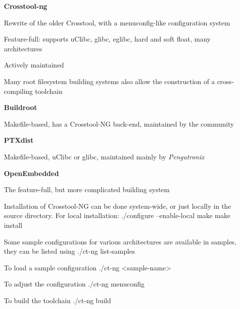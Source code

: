   \startitemize
  \item {\bf Crosstool-ng}
    \startitemize
    \item Rewrite of the older Crosstool, with a menuconfig-like configuration
      system
    \item Feature-full: supports uClibc, glibc, eglibc, hard and soft
      float, many architectures
    \item Actively maintained
    \item {}
    \stopitemize
  \stopitemize

Many root filesystem building systems also allow the construction of
a cross-compiling toolchain
\startitemize
\item {\bf Buildroot}
  \startitemize
  \item Makefile-based, has a Crosstool-NG back-end, maintained by the
    community
  \item {}
  \stopitemize
\item {\bf PTXdist}
  \startitemize
  \item Makefile-based, uClibc or glibc, maintained mainly by {\em Pengutronix}
  \item {}
  \stopitemize
\item {\bf OpenEmbedded}
  \startitemize
  \item The feature-full, but more complicated building system
  \item {}
  \stopitemize
\stopitemize

  \startitemize
  \item Installation of Crosstool-NG can be done system-wide, or just locally in
    the source directory. For local installation:
\starttyping
./configure --enable-local
make
make install
\stoptyping
  \item Some sample configurations for various architectures are
    available in
    samples, they can be listed using
\starttyping
./ct-ng list-samples
\stoptyping
  \item To load a sample configuration
\starttyping
./ct-ng <sample-name>
\stoptyping
  \item To adjust the configuration
\starttyping
./ct-ng menuconfig
\stoptyping
  \item To build the toolchain
\starttyping
./ct-ng build
\stoptyping
  \stopitemize

